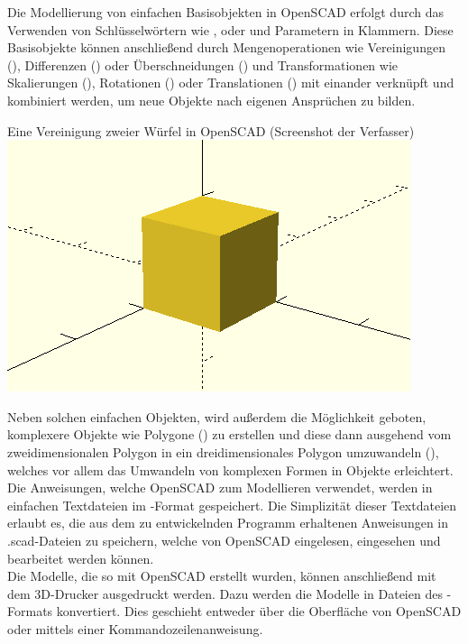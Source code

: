 Die Modellierung von einfachen Basisobjekten in OpenSCAD erfolgt durch das Verwenden von Schlüsselwörtern wie ,  oder  und Parametern in Klammern.
Diese Basisobjekte können anschließend durch Mengenoperationen wie Vereinigungen (), Differenzen () oder Überschneidungen () und Transformationen wie Skalierungen (), Rotationen () oder Translationen () mit einander verknüpft und kombiniert werden, um neue Objekte nach eigenen Ansprüchen zu bilden.

\begin{Bild}{Eine Vereinigung zweier Würfel in OpenSCAD (Screenshot der Verfasser)}
	\includegraphics{Bilder/OpenSCAD_Union}
\end{Bild}

Neben solchen einfachen Objekten, wird außerdem die Möglichkeit geboten, komplexere Objekte wie Polygone () zu erstellen und diese dann ausgehend vom zweidimensionalen Polygon in ein dreidimensionales Polygon umzuwandeln (), welches vor allem das Umwandeln von komplexen Formen in Objekte erleichtert. \\

Die Anweisungen, welche OpenSCAD zum Modellieren verwendet, werden in einfachen Textdateien im -Format gespeichert.
Die Simplizität dieser Textdateien erlaubt es, die aus dem zu entwickelnden Programm erhaltenen Anweisungen in .scad-Dateien zu speichern, welche von OpenSCAD eingelesen, eingesehen und bearbeitet werden können. \\

Die Modelle, die so mit OpenSCAD erstellt wurden, können anschließend mit dem 3D-Drucker ausgedruckt werden.
Dazu werden die Modelle in Dateien des -Formats konvertiert.
Dies geschieht entweder über die Oberfläche von OpenSCAD oder mittels einer Kommandozeilenanweisung.

